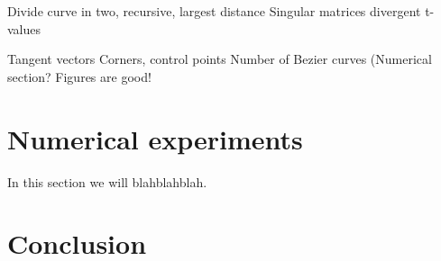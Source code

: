 \documentclass[10pt]{article}
\begin{document}
Divide curve in two, recursive, largest distance
Singular matrices
divergent t-values


Tangent vectors
Corners, control points
Number of Bezier curves (Numerical section?
Figures are good!


\section{Numerical experiments}

In this section we will blahblahblah. 



\section{Conclusion}
\cite{Plass:1983}


\end{document}
